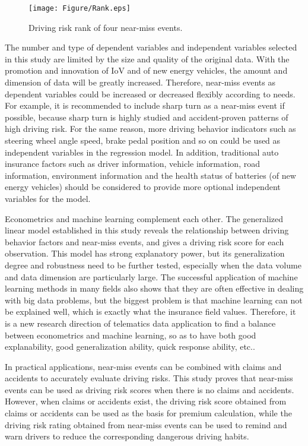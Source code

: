 \documentclass[entropy,article,submit,moreauthors,LaTeX and dvi2pdf]{Definitions/mdpi}
\begin{document}
\begin{figure}[htbp]
\widefigure
\texttt{[image: Figure/Rank.eps]}
\caption{Driving risk rank of four near-miss events.}
\label{rank}
\end{figure}
\begin{paracol}{2}
\linenumbers
\switchcolumn

The number and type of dependent variables and independent variables selected in this study are limited by the size and quality of the original data. With the promotion and innovation of IoV and  of new energy vehicles, the amount and dimension of data will be greatly increased. Therefore, near-miss events as dependent variables could be increased or decreased flexibly according to needs. For example, it is recommended to include sharp turn as a near-miss event if possible, because sharp turn is highly studied and accident-proven patterns of high driving risk. For the same reason, more driving behavior indicators such as steering wheel angle speed, brake pedal position and so on could be used as independent variables in the regression model. In addition, traditional auto insurance factors such as driver information, vehicle information, road information, environment information and the health status of batteries (of new energy vehicles) should be considered to provide more optional independent variables for the model.

Econometrics and machine learning complement each other. The generalized linear model established in this study reveals the relationship between driving behavior factors and near-miss events, and gives a driving risk score for each observation. This model has strong explanatory power, but its generalization degree and robustness need to be further tested, especially when the data volume and data dimension are particularly large. The successful application of machine learning methods in many fields also shows that they are often effective in dealing with big data problems, but the biggest problem is that machine learning can not be explained well, which is exactly what the insurance field values. Therefore, it is a new research direction of telematics data application to find a balance between econometrics and machine learning, so as to have both good explanability, good generalization ability, quick response ability,  etc.\cite{gao2021boosting,so2021synthetic}.

In practical applications, near-miss events can be combined with claims and accidents to accurately evaluate driving risks. This study proves that near-miss events can be used as driving risk scores when there is no claims and accidents. However, when claims or accidents exist, the driving risk score obtained from claims or accidents can be used as the basis for premium calculation, while the driving risk rating obtained from near-miss events can be used to remind and warn drivers to reduce the corresponding dangerous driving habits.


\end{paracol}
\end{document}
